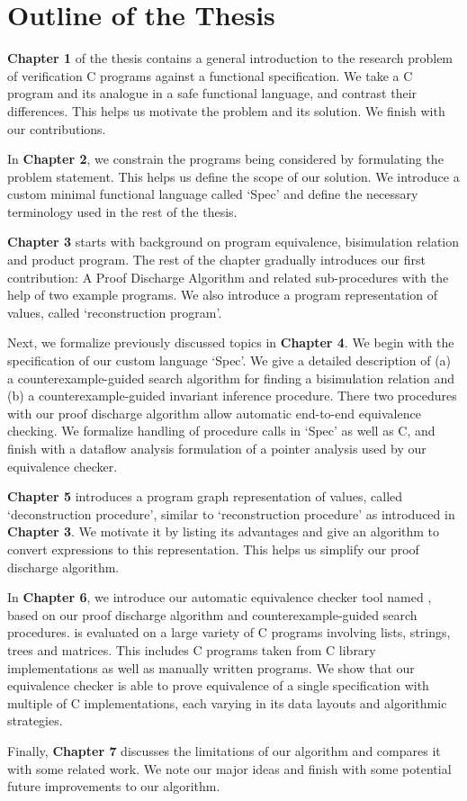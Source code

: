 \vspace{-12px}
\section{Outline of the Thesis}
\vspace{-10px}
\label{sec:outlinethesis}
\textbf{Chapter 1} of the thesis contains a general introduction to the research problem of verification C programs against a functional specification.
We take a C program and its analogue in a safe functional language, and contrast their differences. This helps us motivate the problem and its solution.
We finish with our contributions.

In \textbf{Chapter 2}, we constrain the programs being considered by formulating the problem statement. This helps us define the scope of our solution.
We introduce a custom minimal functional language called `Spec' and define the necessary terminology used in the rest of the thesis.

\textbf{Chapter 3} starts with background on program equivalence, bisimulation relation and product program.
The rest of the chapter gradually introduces our first contribution: A Proof Discharge Algorithm and related sub-procedures with the help
of two example programs. We also introduce a program representation of values, called `reconstruction program'.

Next, we formalize previously discussed topics in \textbf{Chapter 4}. We begin with the specification of our custom language `Spec'.
We give a detailed description of (a) a counterexample-guided search algorithm for finding a bisimulation relation and (b) a counterexample-guided
invariant inference procedure. There two procedures with our proof discharge algorithm allow automatic end-to-end equivalence checking.
We formalize handling of procedure calls in `Spec' as well as C, and finish with a dataflow analysis formulation of a pointer analysis
used by our equivalence checker.

\textbf{Chapter 5} introduces a program graph representation of values, called `deconstruction procedure', similar to `reconstruction procedure' as introduced in \textbf{Chapter 3}.
We motivate it by listing its advantages and give an algorithm to convert expressions to this representation.
This helps us simplify our proof discharge algorithm.

In \textbf{Chapter 6}, we introduce our automatic equivalence checker tool named \toolName{}, based on our proof discharge algorithm
and counterexample-guided search procedures.
\toolName{} is evaluated on a large variety of C programs involving lists, strings, trees and matrices.
This includes C programs taken from C library implementations as well as manually written programs. We show that our equivalence checker is able
to prove equivalence of a single specification with multiple of C implementations, each varying in its data layouts and algorithmic
strategies.

Finally, \textbf{Chapter 7} discusses the limitations of our algorithm and compares it with some related work. We note our major ideas and finish with
some potential future improvements to our algorithm.
